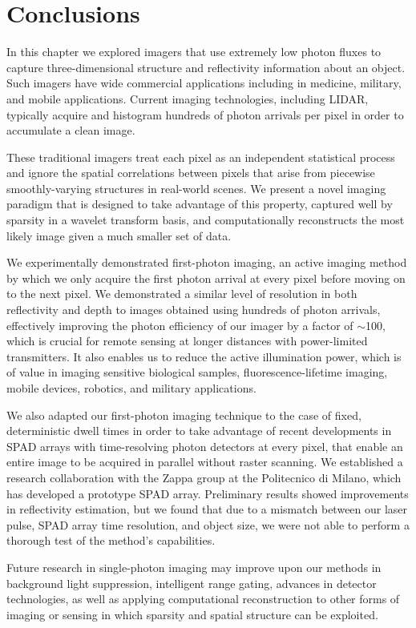 \section{Conclusions}

In this chapter we explored imagers that use extremely low photon fluxes to capture three-dimensional structure and reflectivity information about an object. Such imagers have wide commercial applications including in medicine, military, and mobile applications. Current imaging technologies, including LIDAR, typically acquire and histogram hundreds of photon arrivals per pixel in order to accumulate a clean image.

These traditional imagers treat each pixel as an independent statistical process and ignore the spatial correlations between pixels that arise from piecewise smoothly-varying structures in real-world scenes. We present a novel imaging paradigm that is designed to take advantage of this property, captured well by sparsity in a wavelet transform basis, and computationally reconstructs the most likely image given a much smaller set of data.

We experimentally demonstrated first-photon imaging, an active imaging method by which we only acquire the first photon arrival at every pixel before moving on to the next pixel. We demonstrated a similar level of resolution in both reflectivity and depth to images obtained using hundreds of photon arrivals, effectively improving the photon efficiency of our imager by a factor of $\sim$100, which is crucial for remote sensing at longer distances with power-limited transmitters. It also enables us to reduce the active illumination power, which is of value in imaging sensitive biological samples, fluorescence-lifetime imaging, mobile devices, robotics, and military applications.

We also adapted our first-photon imaging technique to the case of fixed, deterministic dwell times in order to take advantage of recent developments in SPAD arrays with time-resolving photon detectors at every pixel, that enable an entire image to be acquired in parallel without raster scanning. We established a research collaboration with the Zappa group at the Politecnico di Milano, which has developed a prototype SPAD array. Preliminary results showed improvements in reflectivity estimation, but we found that due to a mismatch between our laser pulse, SPAD array time resolution, and object size, we were not able to perform a thorough test of the method's capabilities.

Future research in single-photon imaging may improve upon our methods in background light suppression, intelligent range gating, advances in detector technologies, as well as applying computational reconstruction to other forms of imaging or sensing in which sparsity and spatial structure can be exploited.


